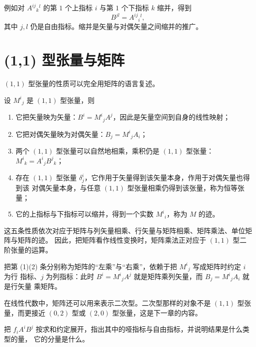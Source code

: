 例如对 $A^{ij}{}_k{}^l$ 的第 $1$ 个上指标 $i$ 与第 $1$ 个下指标 $k$ 缩并，得到
\[
B^{jl}=A^{ij}{}_i{}^l ,
\]
其中 $j,l$ 仍是自由指标。缩并是矢量与对偶矢量之间缩并的推广。

\section{(1,1) 型张量与矩阵}

$(1,1)$ 型张量的性质可以完全用矩阵的语言复述。

\begin{proposition}[(1,1) 型张量的五条性质]
设 $M^i{}_j$ 是 $(1,1)$ 型张量，则
\begin{enumerate}
\item 它把矢量映为矢量：$B^i=M^i{}_jA^j$，因此是矢量空间到自身的线性映射；
\item 它把对偶矢量映为对偶矢量：$B_j=M^i{}_jA_i$；
\item 两个 $(1,1)$ 型张量可以自然地相乘，乘积仍是 $(1,1)$ 型张量：
$M^i{}_k=A^i{}_jB^j{}_k$；
\item 存在 $(1,1)$ 型张量 $\delta^i_j$，它作用于矢量得到该矢量本身，作用于对偶矢量也得到该
对偶矢量本身，与任意 $(1,1)$ 型张量相乘仍得到该张量，称为恒等张量；
\item 它的上指标与下指标可以缩并，得到一个实数 $M^i{}_i$，称为 $M$ 的迹。
\end{enumerate}
\end{proposition}

这五条性质依次对应于矩阵与列矢量相乘、行矢量与矩阵相乘、矩阵乘法、单位矩阵与矩阵的迹。
因此，把矩阵看作线性变换时，矩阵乘法正对应于 $(1,1)$ 型二阶张量的运算。

\begin{remark}
把第 (1)(2) 条分别称为矩阵的“左乘”与“右乘”，依赖于把 $M^i{}_j$ 写成矩阵时约定 $i$ 为行
指标、$j$ 为列指标：此时 $B^i=M^i{}_jA^j$ 就是矩阵乘列矢量，而 $B_j=M^i{}_jA_i$ 就是行矢量
乘矩阵。
\end{remark}

在线性代数中，矩阵还可以用来表示二次型。二次型那样的对象不是 $(1,1)$ 型张量，而更接近
$(0,2)$ 型或 $(2,0)$ 型张量，这是下一章的内容。

\begin{exercise}
把 $f_iA^iB^j$ 按求和约定展开，指出其中的哑指标与自由指标，并说明结果是什么类型的量，
它的分量是什么。
\end{exercise}
